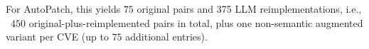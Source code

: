 For AutoPatch, this yields $75$ original pairs and 375 LLM reimplementations, i.e., \ $450$ original-plus-reimplemented pairs in total, plus one non-semantic augmented variant per CVE (up to $75$ additional entries).


